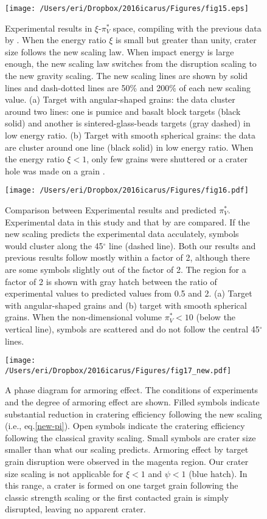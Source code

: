 \documentclass[3p,authoryear]{elsarticle}
\begin{document}
\begin{figure}[htbp]
	\centering
	\texttt{[image: /Users/eri/Dropbox/2016icarus/Figures/fig15.eps]}
	\caption{Experimental results in $\xi$-$\pi_V^*$ space, compiling with the previous data by \citet{schmidt1980, mizutani1983, cintala1999, yamamoto2006, guettler2012, holsapple2014}. When the energy ratio $\xi$ is small but greater than unity, crater size follows the new scaling law. When impact energy is large enough, the new scaling law switches from the disruption scaling to the new gravity scaling. The new scaling lines are shown by solid lines and dash-dotted lines are 50\% and 200\% of each new scaling value. (a) Target with angular-shaped grains: the data cluster around two lines: one is pumice and basalt block targets (black solid) and another is sintered-glass-beads targets (gray dashed) in low energy ratio. (b) Target with smooth spherical grains: the data are cluster around one line (black solid) in low energy ratio. When the energy ratio $\xi<1$, only few grains were shuttered or a crater hole was made on a grain \citep{guettler2012}.}
	\label{xi_vs_newpiV}
	\centering
\end{figure}

\begin{figure}[htbp]
	\centering
	\texttt{[image: /Users/eri/Dropbox/2016icarus/Figures/fig16.pdf]}
	\caption{Comparison between Experimental results and predicted $\pi_V^*$. Experimental data in this study and that by \citet{schmidt1980, mizutani1983, cintala1999, yamamoto2006, guettler2012, holsapple2014} are compared. If the new scaling predicts the experimental data acculately, symbols would cluster along the 45$^\circ$ line (dashed line). Both our results and previous results follow mostly within a factor of 2, although there are some symbols slightly out of the factor of 2. The region for a factor of 2 is shown with gray hatch between the ratio of experimental values to predicted values from 0.5 and 2. (a) Target with angular-shaped grains and (b) target with smooth spherical grains. When the non-dimensional volume $\pi_V^*<10$ (below the vertical line), symbols are scattered and do not follow the central 45$^\circ$ lines.}
	\label{check-new-pi}
	\centering
\end{figure}


\begin{figure}
	\centering
	\texttt{[image: /Users/eri/Dropbox/2016icarus/Figures/fig17\_new.pdf]}
	\caption{A phase diagram for armoring effect. The conditions of experiments and the degree of armoring effect are shown. Filled symbols indicate substantial reduction in cratering efficiency following the new scaling (i.e., eq.\eqref{new-pi}). Open symbols indicate the cratering efficiency following the classical gravity scaling. Small symbols are crater size smaller than what our scaling predicts. Armoring effect by target grain disruption were observed in the magenta region. Our crater size scaling is not applicable for $\xi<1$ and $\psi<1$ (blue hatch). In this range, a crater is formed on one target grain following the classic strength scaling or the first contacted grain is simply disrupted, leaving no apparent crater.}
	\label{psi-xi}
	\centering
\end{figure}
\end{document}
